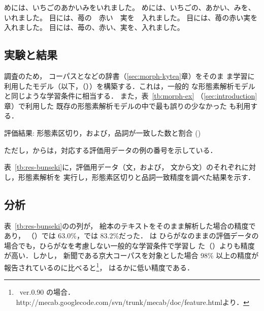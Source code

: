 \documentclass[japanese]{jnlp_1.4}
\newcommand{\kodomo}{}
\newcommand{\mecab}{}
\newcommand{\kytea}{}
\newcommand{\naistj}{}
\newcommand{\hinoki}{}
\newcommand{\Org}{}
\newcommand{\Def}{}
\newcommand{\refs}[1]{}
\newcommand{\pos}[1]{}
\begin{document}
 \begin{exe}
 \ex \label{s:eva-del}
めには、いちごのあかいみをいれました。
 \ex \label{s:eva-punc}
めには、いちごの、あかい、みを、いれました。
 \ex \label{s:eva-han}
目には、苺の　赤い　実を　入れました。
  \ex \label{s:eva-handel}
目には、苺の赤い実を入れました。
  \ex \label{s:eva-hanpunc}
目には、苺の、赤い、実を、入れました。
\end{exe} 


\subsection{実験と結果}
\label{sec:bunseki-exp}

調査のため，
\hinoki コーパスと\naistj などの辞書（\ref{sec:morph-kytea}章）をそのま
ま学習に利用したモデル（以下，\kytea（\Def））を構築する．これは，一般的
な形態素解析モデルと同じような学習条件に相当する．
また，表~\ref{tb:morph-ex} （\ref{sec:introduction}章）で利用した
既存の形態素解析モデルの中で最も誤りの少なかった \mecab も利用する．

\begin{table}[b]
\caption{評価結果: 形態素区切り，および，品詞が一致した数と割合 (\kodomo)}
\label{tb:res-bunseki}

\par\vspace{4pt}
\small
ただし，\refs{eva-org}から\refs{eva-handel}は，対応する評価用データの例の番号を示している．
\par
\end{table}

表~\ref{tb:res-bunseki}に，評価用データ（文\refs{eva-org}，および，
文\refs{eva-del}から文\refs{eva-hanpunc}）のそれぞれに対し，形態素解析を
実行し，形態素区切りと品詞一致精度を調べた結果を示す．



\subsection{分析}
\label{sec:ana-sphan}


表~\ref{tb:res-bunseki}の\pos{\Org \refs{eva-org}}の列が，
絵本のテキストをそのまま解析した場合の精度であり，
\kytea（\Def）では 63.0\%，\mecab では 83.2\%だった．
\mecab は
ひらがなのままの評価データの場合でも，ひらがなを考慮しない一般的な学習条件で学習し
た\kytea（\Def）よりも精度が高い．しかし，
新聞である京大コーパスを対象とした場合
98\% 以上の精度が報告されているのに比べると\footnote{\mecab\ ver.0.90 の場合．http://mecab.googlecode.com/svn/trunk/mecab/doc/feature.htmlより．}，
はるかに低い精度である．
\end{document}

